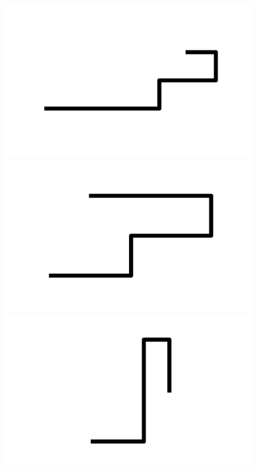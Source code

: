 \documentclass[]{report}
\begin{document}
\includegraphics[scale=.1]{pictures/21/state_cluster_shapes_355.pdf} 
\includegraphics[scale=.1]{pictures/21/state_cluster_shapes_356.pdf} 
\includegraphics[scale=.1]{pictures/21/state_cluster_shapes_357.pdf} 
\end{document}
